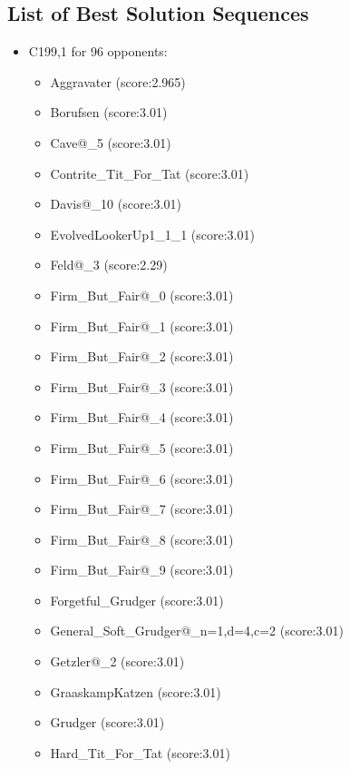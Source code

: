 \begin{appendices}
    \chapter{List of Best Solution Sequences}\label{apndx:solutionGroups}
    \begin{itemize}
        \item C199,1 for 96 opponents:
        \begin{multicols}{3}
            \begin{itemize}
                \item Aggravater (score:2.965)
                \item Borufsen (score:3.01)
                \item Cave@\_5 (score:3.01)
                \item Contrite\_Tit\_For\_Tat (score:3.01)
                \item Davis@\_10 (score:3.01)
                \item EvolvedLookerUp1\_1\_1 (score:3.01)
                \item Feld@\_3 (score:2.29)
                \item Firm\_But\_Fair@\_0 (score:3.01)
                \item Firm\_But\_Fair@\_1 (score:3.01)
                \item Firm\_But\_Fair@\_2 (score:3.01)
                \item Firm\_But\_Fair@\_3 (score:3.01)
                \item Firm\_But\_Fair@\_4 (score:3.01)
                \item Firm\_But\_Fair@\_5 (score:3.01)
                \item Firm\_But\_Fair@\_6 (score:3.01)
                \item Firm\_But\_Fair@\_7 (score:3.01)
                \item Firm\_But\_Fair@\_8 (score:3.01)
                \item Firm\_But\_Fair@\_9 (score:3.01)
                \item Forgetful\_Grudger (score:3.01)
                \item General\_Soft\_Grudger@\_n=1,d=4,c=2 (score:3.01)
                \item Getzler@\_2 (score:3.01)
                \item GraaskampKatzen (score:3.01)
                \item Grudger (score:3.01)
                \item Hard\_Tit\_For\_Tat (score:3.01)

\end{itemize}
\end{multicols}
\end{itemize}
\end{appendices}
